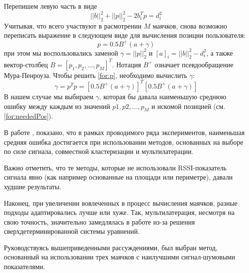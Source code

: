 \begin{itemize}
\[    \]
    Перепишем левую часть в виде
    \begin{equation} \label{for:neededPos}
            || b ||^2_2 + || p ||^2_2 - 2b_i^Tp = d_i^2    
    \end{equation}
    Учитывая, что всего участвуют в расмотрении $M$ маячков, снова возможно переписать выражение в следующем виде для вычисления позиции пользователя:
    \begin{equation} \label{for:p}
        p = 0.5B^+(a+\gamma)    
    \end{equation}
    при этом мы воспользовались заменой $\gamma = || p ||^2_2$ и $[a]_i = || b ||^2_2 - d_i^2$, а также вектор-столбец $B = [p_1, p_2, ..., p_M]^T$. Нотация $B^+$ означает псевдообращение Мура-Пенроуза. Чтобы решить \ref{for:p}, необходимо вычислить $\gamma$:
    \[
        \gamma = p^T p = [0.5B^+(a+\gamma)]^T [0.5B^+(a+\gamma)]
    \]
    В нашем случае мы выбираем $\gamma$, которая бы давала наименьшую среднюю ошибку между каждым из значений $p1, p2, ..., p_M$ и искомой позицией (см. \ref{for:neededPos}). \\
\end{itemize}

    В работе \cite{artemenko2012comparison}, показано, что в рамках проводимого ряда экспериментов, наименьшая средняя ошибка достигается при использовании методов, основанных на выборе по силе сигнала, совместной кластеризации и мультилатерации. 
    
    Важно отметить, что те методы, которые не использовали RSSI-по\-ка\-за\-тель сигнала явно (как например основанные на площади или периметре), давали худшие результаты. 
    
    Наконец, при увеличении вовлеченных в процесс вычисления маячков, разные подходы адаптировались лучше или хуже. Так, мультилатерация, несмотря на свою точность, значительно замедлялась в работе из-за решения сверхдетерминированной системы уравнений. 
    
    Руководствуясь вышеприведенными рассуждениями, был выбран метод, основанный на использовании трех маячков с наилучшими сигнал-шу\-мо\-вы\-ми показателями.